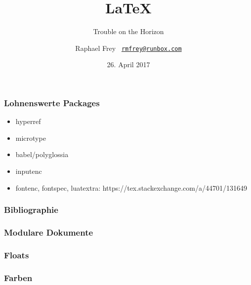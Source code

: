 \documentclass{beamer}                %
\title{\vspace*{4em}\Huge\LaTeX}
\subtitle{\hfill Trouble on the Horizon}
\date{26. April 2017}
\author{%
    Raphael Frey%
    \hfill%
    \scriptsize\texttt{%
        \href{mailto:rmfrey@runbox.com}%
        {rmfrey@runbox.com}}}
\begin{document}
                                                              

\frame[plain]{\titlepage} %





\begin{frame} %
    \frametitle{Lohnenswerte Packages}
    \begin{itemize}
        \item hyperref
        \item microtype
        \item babel/polyglossia
        \item inputenc
        \item fontenc, fontspec, luatextra: https://tex.stackexchange.com/a/44701/131649
    \end{itemize}
\end{frame}

\begin{frame} %
    \frametitle{Bibliographie}
\end{frame}

\begin{frame} %
    \frametitle{Modulare Dokumente}
\end{frame}

\begin{frame} %
    \frametitle{Floats}
\end{frame}

\begin{frame} %
    \frametitle{Farben}
\end{frame}
\end{document}
